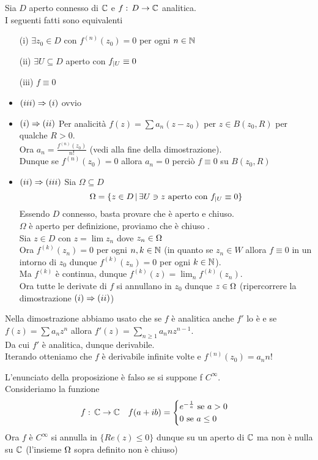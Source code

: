\newpage
\begin{prop}Sia $D$ aperto connesso di $\mathbb{C}$ e $f:\, D\to \mathbb{C}$ analitica.\\
I seguenti fatti sono equivalenti
\begin{itemize}
\item[(i)]$\exists z_0\in D$ con $f^{(n)} (z_0)=0$ per ogni $n \in \mathbb{N}$
\item[(ii)] $\exists U\subseteq D$ aperto con $f_{\vert U} \equiv 0$
\item[(iii)] $f\equiv 0 $
\end{itemize}
\proof \bbianco
\begin{itemize}
\item $(iii) \Rightarrow (i)$ ovvio
\item $(i) \Rightarrow (ii)$ Per analicit\`a $f(z)= \sum a_n (z-z_0) $ per $z\in B(z_0,R)$ per qualche $R>0$.\\
Ora $a_n = \frac{f^{(n)}(z_0)}{n!}$ (vedi alla fine della dimostrazione).\\
Dunque se $f^{(n)}(z_0)=0$ allora $a_n=0$ perci\`o $f\equiv 0 $ su $B(z_0,R)$
\item $(ii)\Rightarrow (iii)$ Sia $\Omega\subseteq D $ 
$$\Omega=\{ z\in D \, \vert \, \exists U \ni z \text{ aperto con }f_{\vert U}\equiv 0\}$$
Essendo $D$ connesso, basta provare che \`e aperto e chiuso.\\
$\Omega$ \`e aperto per definizione, proviamo che \`e chiuso .\\
Sia $z\in D$ con $z=\lim z_n$ dove $z_n \in \Omega$\\
Ora $f^{(k)}(z_n)=0$ per ogni $n,k\in \mathbb{N}$ (in quanto se $z_n \in W$ allora $f\equiv 0$ in un intorno di $z_0$ dunque $f^{(k)}(z_n)=0$ per ogni $k\in \mathbb{N}$).\\
Ma $f^{(k)}$ \`e continua, dunque $f^{(k)}(z) = \lim_n f^{(k)}(z_n)$.\\
Ora tutte le derivate di $f$ si annullano in $z_0$ dunque $z\in \Omega$ (ripercorrere la dimostrazione $(i)\Rightarrow (ii)$)
\end{itemize}
\end{prop}
\begin{oss}
Nella dimostrazione abbiamo usato che se $f$ \`e analitica anche $f'$ lo \`e e se $f(z) =\sum a_n z^n $ allora $f'(z) =\sum_{n\geq 1 }  a_n n z^{n-1}$.\\
Da cui $f'$ \`e analitica, dunque derivabile.\\
Iterando otteniamo che $f$ \`e derivabile infinite volte e 
$f^{(n)}(z_0)=a_n n!$
\end{oss}
\begin{oss}L'enunciato della proposizione \`e falso se si suppone f $C^\infty$.\\
Consideriamo la funzione 
$$f:\, \mathbb{C}\to \mathbb{C} \quad f(a+ib)=
 \begin{cases} e^{-\frac{1}{a}} \text  { se } a >0 \\  0 \text{ se } a\leq 0 \end{cases}$$
Ora $f$ \`e $C^\infty$ si annulla in $\{ Re(z) \leq 0 \}$ dunque su un aperto di $\mathbb{C}$ ma non \`e nulla su $\mathbb{C}$ (l'insieme $\Omega$ sopra definito non \`e chiuso)
\end{oss}
